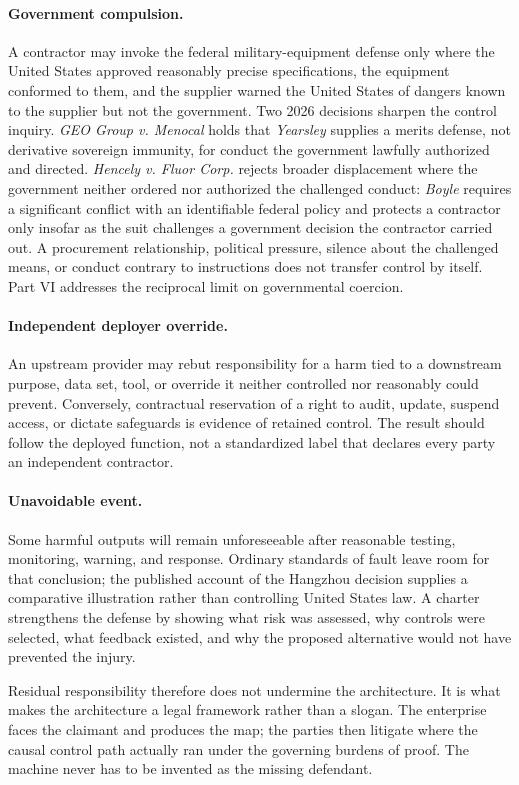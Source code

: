\paragraph{Government compulsion.}
A contractor may invoke the federal military-equipment defense only where the United States approved reasonably precise specifications, the equipment conformed to them, and the supplier warned the United States of dangers known to the supplier but not the government. Two 2026 decisions sharpen the control inquiry. \emph{GEO Group v. Menocal} holds that \emph{Yearsley} supplies a merits defense, not derivative sovereign immunity, for conduct the government lawfully authorized and directed. \emph{Hencely v. Fluor Corp.} rejects broader displacement where the government neither ordered nor authorized the challenged conduct: \emph{Boyle} requires a significant conflict with an identifiable federal policy and protects a contractor only insofar as the suit challenges a government decision the contractor carried out. A procurement relationship, political pressure, silence about the challenged means, or conduct contrary to instructions does not transfer control by itself. Part VI addresses the reciprocal limit on governmental coercion.

\paragraph{Independent deployer override.}
An upstream provider may rebut responsibility for a harm tied to a downstream purpose, data set, tool, or override it neither controlled nor reasonably could prevent. Conversely, contractual reservation of a right to audit, update, suspend access, or dictate safeguards is evidence of retained control. The result should follow the deployed function, not a standardized label that declares every party an independent contractor.

\paragraph{Unavoidable event.}
Some harmful outputs will remain unforeseeable after reasonable testing, monitoring, warning, and response. Ordinary standards of fault leave room for that conclusion; the published account of the Hangzhou decision supplies a comparative illustration rather than controlling United States law. A charter strengthens the defense by showing what risk was assessed, why controls were selected, what feedback existed, and why the proposed alternative would not have prevented the injury.

Residual responsibility therefore does not undermine the architecture. It is what makes the architecture a legal framework rather than a slogan. The enterprise faces the claimant and produces the map; the parties then litigate where the causal control path actually ran under the governing burdens of proof. The machine never has to be invented as the missing defendant.

